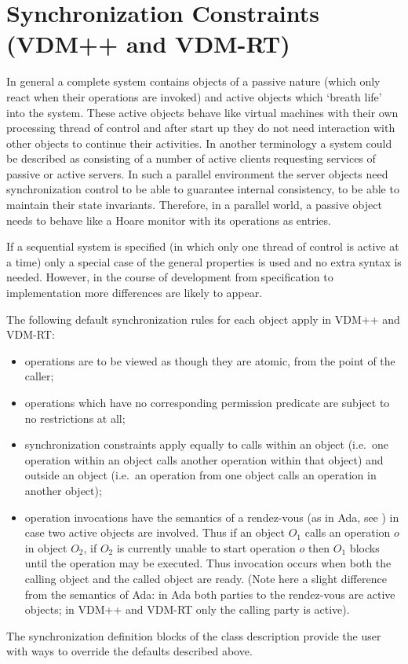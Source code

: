 \documentclass{overturerepchap}
\begin{document}
\chapter{Synchronization Constraints (VDM++ and VDM-RT)}\label{ch:sync}

In general a complete system contains objects of a passive
nature (which only react when their operations are invoked) and active
objects which `breath life' into the system. These active objects
behave like virtual machines with their own processing thread of
control and after start up they do not need interaction with other
objects to continue their activities.
In another terminology a system could be described as
consisting of a number of active clients requesting services of passive
or active servers.
In such a parallel environment the server objects need
synchronization control to be able to guarantee internal consistency,
to be able to maintain their state invariants.
Therefore, in a parallel world, a passive object needs to
behave like a Hoare monitor with its operations as entries.

If a sequential system is specified (in which only one thread of control
is active at a time) only a special case of the general properties is used
and no extra syntax is needed. However, in the course of development from
specification to implementation more differences are likely to appear.

The following default synchronization rules for each object apply in
VDM++ and VDM-RT:
\begin{itemize}
\item operations are to be viewed as though they are atomic, from the
point of the caller; 
\item operations which have no corresponding permission predicate are
  subject to no restrictions at all;
\item synchronization constraints apply equally to calls within an
  object (i.e.\ one operation within an object calls another operation
  within that object) and outside an object (i.e.\ an operation from
  one object calls an operation in another object);
\item operation invocations have the semantics of a rendez-vous (as in
Ada, see \cite{adalrm}) in case two active objects are involved. Thus if an
object $O_1$ calls an operation $o$ in object $O_2$, if $O_2$ is currently
unable to start operation $o$ then $O_1$ blocks until the operation may be
executed. Thus invocation occurs when both the calling object and the
called object are ready. (Note here a slight difference from the
semantics of Ada: in Ada both parties to the rendez-vous are active
objects; in VDM++ and VDM-RT only the calling party is active).
\end{itemize}
The synchronization definition blocks of the class description provide the
user with ways to override the defaults described above.
\end{document}
